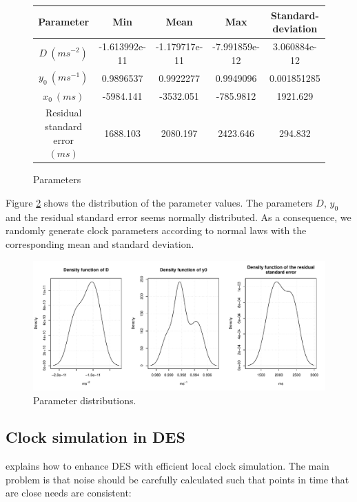 \documentclass[11pt]{article}
\begin{document}
\begin{figure}[h!]
\scriptsize
\begin{center}
\begin{tabular}{|c|c|c|c|c|} 
\hline
Parameter & Min & Mean & Max & Standard-deviation \\
\hline
$D\ (ms^{-2})$ & -1.613992e-11 & -1.179717e-11 & -7.991859e-12 & 3.060884e-12 \\
\hline
$y_0\ (ms^{-1})$ & 0.9896537 & 0.9922277 & 0.9949096 & 0.001851285\\
\hline
$x_0\ (ms)$ & -5984.141 & -3532.051 & -785.9812 & 1921.629\\
\hline
Residual standard error $(ms)$ & 1688.103 &  2080.197  & 2423.646 & 294.832\\
\hline
\end{tabular}
\end{center}
\label{fig:parameter-values}
\caption{Parameters}
\end{figure}

Figure \ref{fig:parameter-distribution} shows the distribution of the parameter values. The parameters $D$, $y_0$ and the residual standard error seems normally distributed. As a consequence, we randomly generate clock parameters according to normal laws with the corresponding mean and standard deviation.

\begin{figure}[h!]
\centering
\includegraphics[width=\textwidth]{pictures/parameters.pdf}
\caption{Parameter distributions.}
\label{fig:parameter-distribution}
\end{figure}

\newpage

\subsection{Clock simulation in DES}

\cite{ring2010clock} explains how to enhance DES with efficient local clock simulation. The main problem is that noise should be carefully calculated such that points in time that are close needs are consistent:
\end{document}
